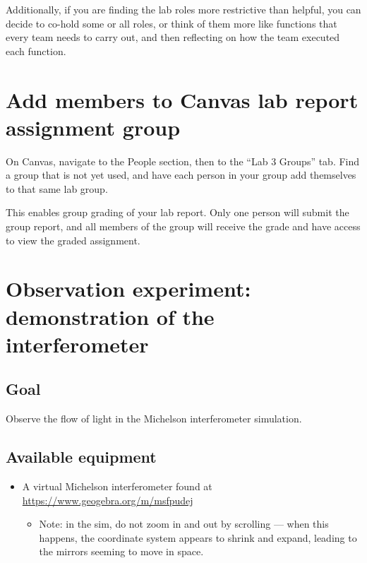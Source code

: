 Additionally, if you are finding the lab roles more restrictive than helpful, you can decide to co-hold some or all roles, or think of them more like functions that every team needs to carry out, and then reflecting on how the team executed each function.

\section{Add members to Canvas lab report assignment group}

\begin{steps}
	\item On Canvas, navigate to the People section, then to the ``Lab 3 Groups'' tab. Find a group that is not yet used, and have each person in your group add themselves to that same lab group.
\end{steps}

This enables group grading of your lab report. Only one person will submit the group report, and all members of the group will receive the grade and have access to view the graded assignment.

\section{Observation experiment: demonstration of the interferometer}

\subsection{Goal}

Observe the flow of light in the Michelson interferometer simulation.

\subsection{Available equipment}

\begin{itemize}
	\item A virtual Michelson interferometer found at \url{https://www.geogebra.org/m/msfpudej}
	\begin{itemize}
		\item Note: in the sim, do not zoom in and out by scrolling --- when this happens, the coordinate system appears to shrink and expand, leading to the mirrors seeming to move in space.
	\end{itemize}
\end{itemize}

